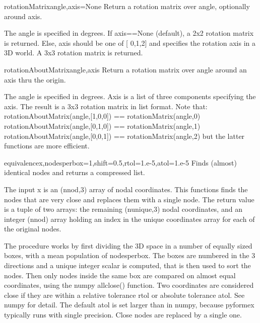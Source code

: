 {{\begin{funcdesc}{rotationMatrix}{angle,axis=None}
    Return a rotation matrix over angle, optionally around axis.

    The angle is specified in degrees.
    If axis==None (default), a 2x2 rotation matrix is returned.
    Else, axis should be one of [ 0,1,2] and specifies the rotation axis
    in a 3D world. A 3x3 rotation matrix is returned.
\end{funcdesc}
    

\begin{funcdesc}{rotationAboutMatrix}{angle,axis}
    Return a rotation matrix over angle around an axis thru the origin.

    The angle is specified in degrees.
    Axis is a list of three components specifying the axis.
    The result is a 3x3 rotation matrix in list format.
    Note that:
      rotationAboutMatrix(angle,[1,0,0]) == rotationMatrix(angle,0) 
      rotationAboutMatrix(angle,[0,1,0]) == rotationMatrix(angle,1) 
      rotationAboutMatrix(angle,[0,0,1]) == rotationMatrix(angle,2)
    but the latter functions are more efficient.
\end{funcdesc}
    


\begin{funcdesc}{equivalence}{x,nodesperbox=1,shift=0.5,rtol=1.e-5,atol=1.e-5}
    Finds (almost) identical nodes and returns a compressed list.

    The input x is an (nnod,3) array of nodal coordinates. This functions finds
    the nodes that are very close and replaces them with a single node.
    The return value is a tuple of two arrays: the remaining (nunique,3) nodal
    coordinates, and an integer (nnod) array holding an index in the unique
    coordinates array for each of the original nodes.

    The procedure works by first dividing the 3D space in a number of
    equally sized boxes, with a mean population of nodesperbox.
    The boxes are numbered in the 3 directions and a unique integer scalar
    is computed, that is then used to sort the nodes.
    Then only nodes inside the same box are compared on almost equal
    coordinates, using the numpy allclose() function. Two coordinates are
    considered close if they are within a relative tolerance rtol or absolute
    tolerance atol. See numpy for detail. The default atol is set larger than
    in numpy, because pyformex typically runs with single precision.
    Close nodes are replaced by a single one.


\end{funcdesc}}}
